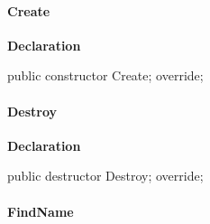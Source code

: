 \documentclass{report}
\newif\ifpdf
\begin{document}
\paragraph*{Create}\hspace*{\fill}

\label{PasDoc_Items.TPasItem-Create}
\begin{list}{}{
\setlength{\itemindent}{0cm}
\setlength{\listparindent}{0cm}
\setlength{\leftmargin}{\evensidemargin}
\addtolength{\leftmargin}{\tmplength}
\settowidth{\labelsep}{X}
\addtolength{\leftmargin}{\labelsep}
\setlength{\labelwidth}{\tmplength}
}
\item[\textbf{Declaration}\hfill]
\ifpdf
\begin{flushleft}
\fi
\begin{ttfamily}
public constructor Create; override;\end{ttfamily}

\ifpdf
\end{flushleft}
\fi

\end{list}
\paragraph*{Destroy}\hspace*{\fill}

\label{PasDoc_Items.TPasItem-Destroy}
\begin{list}{}{
\setlength{\itemindent}{0cm}
\setlength{\listparindent}{0cm}
\setlength{\leftmargin}{\evensidemargin}
\addtolength{\leftmargin}{\tmplength}
\settowidth{\labelsep}{X}
\addtolength{\leftmargin}{\labelsep}
\setlength{\labelwidth}{\tmplength}
}
\item[\textbf{Declaration}\hfill]
\ifpdf
\begin{flushleft}
\fi
\begin{ttfamily}
public destructor Destroy; override;\end{ttfamily}

\ifpdf
\end{flushleft}
\fi

\end{list}
\paragraph*{FindName}\hspace*{\fill}
\end{document}
